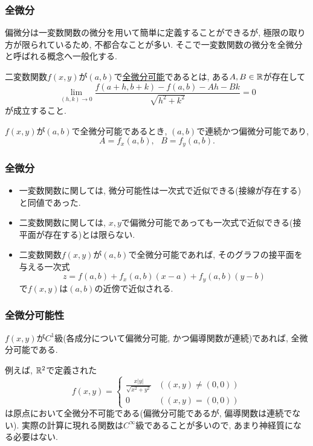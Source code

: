

\begin{frame}
\frametitle{全微分}

偏微分は一変数関数の微分を用いて簡単に定義することができるが, 極限の取り方が限られているため, 不都合なことが多い. 
そこで一変数関数の微分を全微分と呼ばれる概念へ一般化する. 

\begin{Def}
二変数関数$f(x,y)$が$(a,b)$で\underline{全微分可能}であるとは, ある$A, B \in \mathbb{R}$が存在して
$$
\lim_{(h,k)\to0}\frac{f(a+h,b+k)-f(a,b)-Ah-Bk}{\sqrt{h^2+k^2}}=0
$$
が成立すること. 
\end{Def}

$f(x,y)$が$(a,b)$で全微分可能であるとき, $(a,b)$で連続かつ偏微分可能であり, 
$$
A=f_x(a,b), \ \ \ B=f_y(a,b). 
$$
\end{frame}




\begin{frame}
\frametitle{全微分}

\begin{itemize}
\item 一変数関数に関しては, 微分可能性は一次式で近似できる(接線が存在する)と同値であった. 
\item 二変数関数に関しては, $x, y$で偏微分可能であっても一次式で近似できる(接平面が存在する)とは限らない. 
\item 二変数関数$f(x,y)$が$(a, b)$で全微分可能であれば, そのグラフの接平面を与える一次式
$$
z=f(a,b)+f_x(a,b)(x-a)+f_y(a,b)(y-b)
$$
で$f(x,y)$は$(a, b)$の近傍で近似される. 
\end{itemize}

\end{frame}





\begin{frame}
\frametitle{全微分可能性}

\begin{Thm}
$f(x,y)$が$C^1$級(各成分について偏微分可能, かつ偏導関数が連続)であれば, 全微分可能である. 
\end{Thm}

例えば, $\mathbb{R}^2$で定義された
$$
f(x,y)=
\begin{cases}
\frac{x|y|}{\sqrt{x^2+y^2}}  & ((x,y) \ne (0,0)) \\
0 & ((x,y)=(0,0)) 
 \end{cases}
$$
は原点において全微分不可能である(偏微分可能であるが, 偏導関数は連続でない).  
実際の計算に現れる関数は$C^\infty$級であることが多いので, あまり神経質になる必要はない.

\end{frame}



